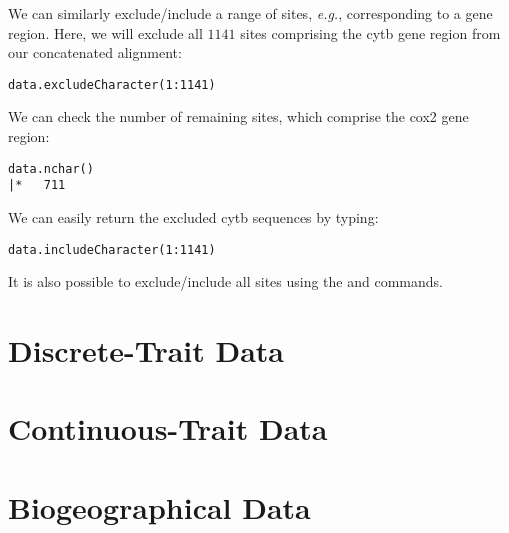 
We can similarly exclude/include a range of sites, {\it e.g.}, corresponding to a gene region.
Here, we will exclude all $1141$ sites comprising the cytb gene region from our concatenated alignment:
{\tt \begin{snugshade*}
\begin{lstlisting}
data.excludeCharacter(1:1141)
\end{lstlisting}
\end{snugshade*}}

We can check the number of remaining sites, which comprise the cox2 gene region:
{\tt \begin{snugshade*}
\begin{lstlisting}
data.nchar()
|*   711
\end{lstlisting}
\end{snugshade*}}

We can easily return the excluded cytb sequences by typing:
{\tt \begin{snugshade*}
\begin{lstlisting}
data.includeCharacter(1:1141)
\end{lstlisting}
\end{snugshade*}}

It is also possible to exclude/include all sites using the  and  commands.



\section{Discrete-Trait Data}



\section{Continuous-Trait Data}


\section{Biogeographical Data}

